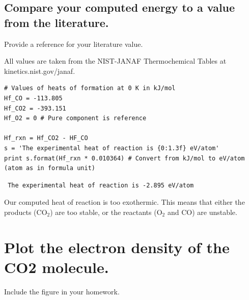 \documentclass[11pt]{article}
\begin{document}
\subsection{Compare your computed energy to a value from the literature.}
\label{sec-2-3}

Provide a reference for your literature value.

All values are taken from the NIST-JANAF Thermochemical Tables at kinetics.nist.gov/janaf.


\begin{verbatim}
# Values of heats of formation at 0 K in kJ/mol
Hf_CO = -113.805
Hf_CO2 = -393.151
Hf_O2 = 0 # Pure component is reference

Hf_rxn = Hf_CO2 - HF_CO
s = 'The experimental heat of reaction is {0:1.3f} eV/atom'
print s.format(Hf_rxn * 0.010364) # Convert from kJ/mol to eV/atom (atom as in formula unit)
\end{verbatim}

\begin{verbatim}
 The experimental heat of reaction is -2.895 eV/atom
\end{verbatim}

Our computed heat of reaction is too exothermic. This means that either the products
(CO$_{2}$) are too stable, or the reactants (O$_{2}$ and CO) are unstable.
\section{Plot the electron density of the CO2 molecule.}
\label{sec-3}

Include the figure in your homework.
\end{document}
